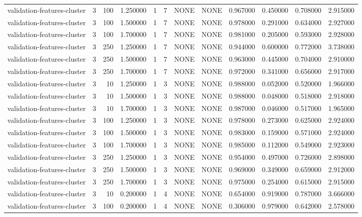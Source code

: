 \begin{tabular}{lrrrllllrrrr}
validation-features-cluster & 3 & 100 & 1.250000 & 1 & 7 & NONE & NONE & 0.967000 & 0.450000 & 0.708000 & 2.915000 \\
validation-features-cluster & 3 & 100 & 1.500000 & 1 & 7 & NONE & NONE & 0.978000 & 0.291000 & 0.634000 & 2.927000 \\
validation-features-cluster & 3 & 100 & 1.700000 & 1 & 7 & NONE & NONE & 0.981000 & 0.205000 & 0.593000 & 2.928000 \\
validation-features-cluster & 3 & 250 & 1.250000 & 1 & 7 & NONE & NONE & 0.944000 & 0.600000 & 0.772000 & 3.738000 \\
validation-features-cluster & 3 & 250 & 1.500000 & 1 & 7 & NONE & NONE & 0.963000 & 0.445000 & 0.704000 & 2.910000 \\
validation-features-cluster & 3 & 250 & 1.700000 & 1 & 7 & NONE & NONE & 0.972000 & 0.341000 & 0.656000 & 2.917000 \\
validation-features-cluster & 3 & 10 & 1.250000 & 1 & 3 & NONE & NONE & 0.988000 & 0.052000 & 0.520000 & 1.966000 \\
validation-features-cluster & 3 & 10 & 1.500000 & 1 & 3 & NONE & NONE & 0.988000 & 0.048000 & 0.518000 & 2.918000 \\
validation-features-cluster & 3 & 10 & 1.700000 & 1 & 3 & NONE & NONE & 0.987000 & 0.046000 & 0.517000 & 1.965000 \\
validation-features-cluster & 3 & 100 & 1.250000 & 1 & 3 & NONE & NONE & 0.978000 & 0.273000 & 0.625000 & 2.924000 \\
validation-features-cluster & 3 & 100 & 1.500000 & 1 & 3 & NONE & NONE & 0.983000 & 0.159000 & 0.571000 & 2.924000 \\
validation-features-cluster & 3 & 100 & 1.700000 & 1 & 3 & NONE & NONE & 0.985000 & 0.112000 & 0.549000 & 2.923000 \\
validation-features-cluster & 3 & 250 & 1.250000 & 1 & 3 & NONE & NONE & 0.954000 & 0.497000 & 0.726000 & 2.898000 \\
validation-features-cluster & 3 & 250 & 1.500000 & 1 & 3 & NONE & NONE & 0.969000 & 0.349000 & 0.659000 & 2.912000 \\
validation-features-cluster & 3 & 250 & 1.700000 & 1 & 3 & NONE & NONE & 0.975000 & 0.254000 & 0.615000 & 2.915000 \\
validation-features-cluster & 3 & 10 & 0.200000 & 1 & 4 & NONE & NONE & 0.654000 & 0.919000 & 0.787000 & 3.666000 \\
validation-features-cluster & 3 & 100 & 0.200000 & 1 & 4 & NONE & NONE & 0.306000 & 0.979000 & 0.642000 & 2.578000 \\

\end{tabular}
